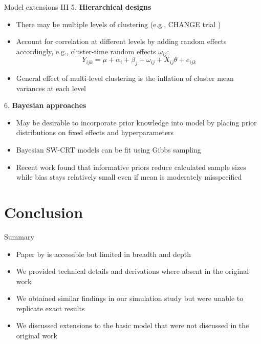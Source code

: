 \documentclass[9pt]{beamer}
\begin{document}
\begin{frame}{Model extensions III}
5. \textbf{Hierarchical designs}
\begin{itemize}

\item
There may be multiple levels of clustering (e.g., CHANGE trial \citep{Lescure:2021})

\item
Account for correlation at different levels by adding random effects accordingly, e.g., cluster-time random effects $\omega_{ij}$:
\[
Y_{ijk} = \mu + \alpha_i + \beta_j + \omega_{ij} + X_{ij}\theta + e_{ijk}
\]

\item
General effect of multi-level clustering is the inflation of cluster mean variances at each level \citep{Teerenstra:2019}

\end{itemize}
\vspace{2em}

6. \textbf{Bayesian approaches}
\begin{itemize}

\item
May be desirable to incorporate prior knowledge into model by placing prior distributions on fixed effects and hyperparameters

\item
Bayesian SW-CRT models can be fit using Gibbs sampling \citep{Cunanan:2016}

\item
Recent work found that informative priors reduce calculated sample sizes while bias stays relatively small even if mean is moderately misspecified \citep{Zhan:2021}

\end{itemize}
\end{frame}



\section{Conclusion}



\begin{frame}{Summary}
\begin{itemize}
\setlength\itemsep{2em}

\item
Paper by \citet{Hussey:2007} is accessible but limited in breadth and depth

\item
We provided technical details and derivations where absent in the original work

\item
We obtained similar findings in our simulation study but were unable to replicate exact results

\item
We discussed extensions to the basic model that were not discussed in the original work

\end{itemize}
\end{frame}
\end{document}
